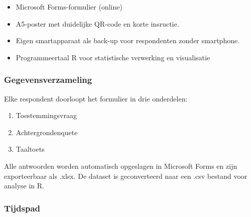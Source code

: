 \documentclass[
]{article}
\providecommand{\tightlist}{%
  \setlength{\itemsep}{0pt}\setlength{\parskip}{0pt}}
\begin{document}
\begin{itemize}
\tightlist
\item
  Microsoft Forms-formulier (online)
\item
  A5-poster met duidelijke QR-code en korte insructie.
\item
  Eigen smartapparaat als back-up voor respondenten zonder smartphone.
\item
  Programmeertaal R voor statistische verwerking en visualisatie
\end{itemize}

\subsubsection{Gegevensverzameling}\label{gegevensverzameling}

Elke respondent doorloopt het formulier in drie onderdelen:

\begin{enumerate}
\def\labelenumi{\arabic{enumi}.}
\tightlist
\item
  Toestemmingsvraag
\item
  Achtergrondenquete
\item
  Taaltoets
\end{enumerate}

Alle antwoorden worden automatisch opgeslagen in Microsoft Forms en zijn
exporteerbaar als .xlsx. De dataset is geconverteerd naar een .csv
bestand voor analyse in R.

\subsubsection{Tijdspad}\label{tijdspad}
\end{document}
